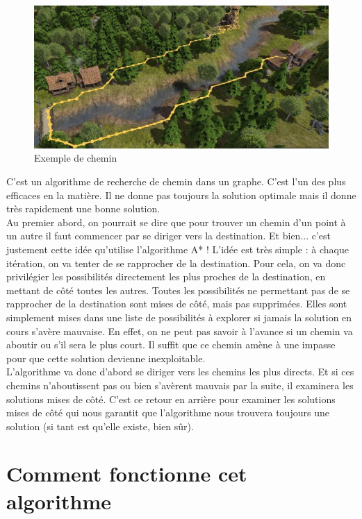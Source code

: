 \begin{figure}[!h]
\centering
\includegraphics[scale=0.5]{images/jeuVideo.jpg}
\caption{Exemple de chemin}
\end{figure}

C'est un algorithme de recherche de chemin dans un graphe. C'est l'un des plus efficaces en la matière. Il ne donne pas toujours la solution optimale mais il donne très rapidement une bonne solution.\\
Au premier abord, on pourrait se dire que pour trouver un chemin d'un point à un autre il faut commencer par se diriger vers la destination. Et bien... c'est justement cette idée qu'utilise l'algorithme A* ! L'idée est très simple : à chaque itération, on va tenter de se rapprocher de la destination. Pour cela, on va donc privilégier les possibilités directement les plus proches de la destination, en mettant de côté toutes les autres. Toutes les possibilités ne permettant pas de se rapprocher de la destination sont mises de côté, mais pas supprimées. Elles
sont simplement mises dans une liste de possibilités à explorer si jamais la solution en cours s'avère mauvaise.
En effet, on ne peut pas savoir à l'avance si un chemin va aboutir ou s'il sera le plus court. Il suffit que ce chemin amène à une impasse pour que cette solution devienne inexploitable.\\
L'algorithme va donc d'abord se diriger vers les chemins les plus directs. Et si ces chemins n'aboutissent pas ou bien s'avèrent mauvais par la suite, il examinera les solutions mises de côté. C'est ce retour en arrière pour examiner les solutions mises de côté qui nous garantit que l'algorithme nous trouvera toujours une solution (si
tant est qu'elle existe, bien sûr).


\section{Comment fonctionne cet algorithme}

